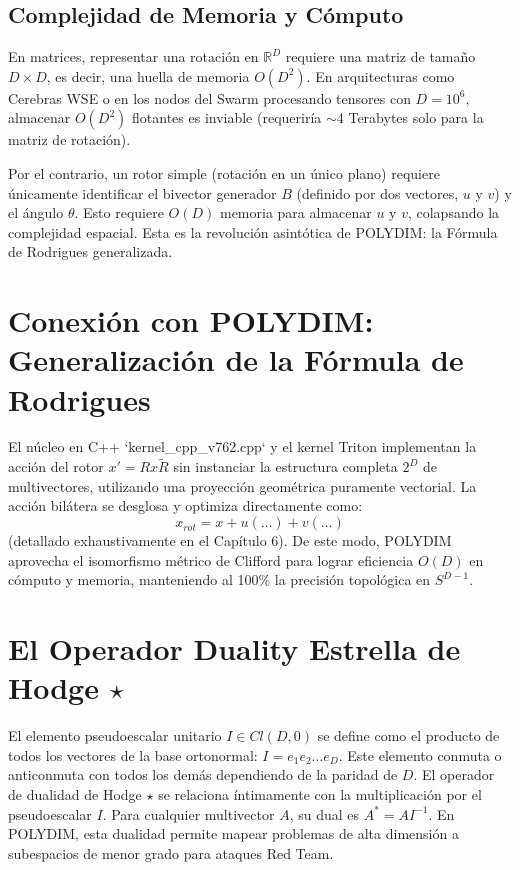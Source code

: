 \subsection{Complejidad de Memoria y Cómputo}
En matrices, representar una rotación en $\mathbb{R}^D$ requiere una matriz de tamaño $D \times D$, es decir, una huella de memoria $O(D^2)$. En arquitecturas como Cerebras WSE o en los nodos del Swarm procesando tensores con $D=10^6$, almacenar $O(D^2)$ flotantes es inviable (requeriría $\sim 4$ Terabytes solo para la matriz de rotación).

Por el contrario, un rotor simple (rotación en un único plano) requiere únicamente identificar el bivector generador $B$ (definido por dos vectores, $u$ y $v$) y el ángulo $\theta$. Esto requiere $O(D)$ memoria para almacenar $u$ y $v$, colapsando la complejidad espacial. Esta es la revolución asintótica de POLYDIM: la Fórmula de Rodrigues generalizada.

\section{Conexión con POLYDIM: Generalización de la Fórmula de Rodrigues}
El núcleo en C++ `kernel_cpp_v762.cpp` y el kernel Triton implementan la acción del rotor $x' = R x \tilde{R}$ sin instanciar la estructura completa $2^D$ de multivectores, utilizando una proyección geométrica puramente vectorial. La acción bilátera se desglosa y optimiza directamente como:
\begin{equation}
    x_{rot} = x + u(\dots) + v(\dots)
\end{equation}
(detallado exhaustivamente en el Capítulo 6). De este modo, POLYDIM aprovecha el isomorfismo métrico de Clifford para lograr eficiencia $O(D)$ en cómputo y memoria, manteniendo al 100\% la precisión topológica en $S^{D-1}$.

\section{El Operador Duality Estrella de Hodge $\star$}
El elemento pseudoescalar unitario $I \in Cl(D,0)$ se define como el producto de todos los vectores de la base ortonormal: $I = e_1 e_2 \dots e_D$. Este elemento conmuta o anticonmuta con todos los demás dependiendo de la paridad de $D$. El operador de dualidad de Hodge $\star$ se relaciona íntimamente con la multiplicación por el pseudoescalar $I$. Para cualquier multivector $A$, su dual es $A^* = A I^{-1}$. En POLYDIM, esta dualidad permite mapear problemas de alta dimensión a subespacios de menor grado para ataques Red Team.

